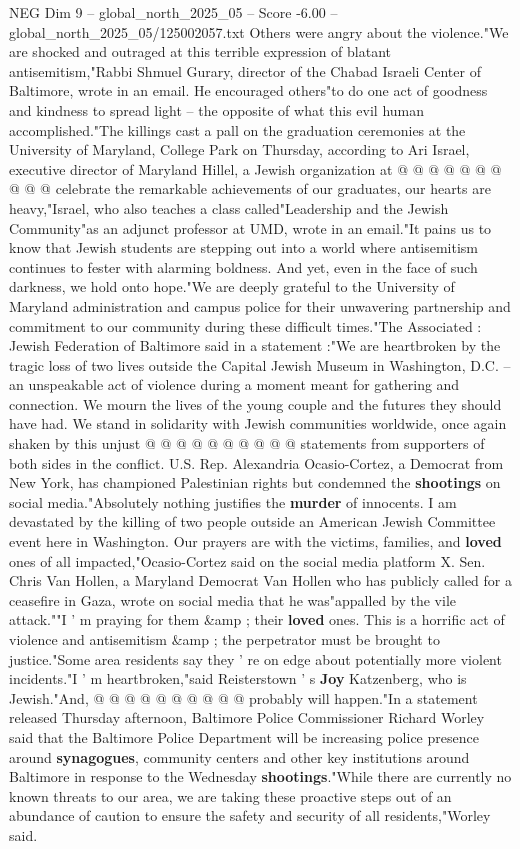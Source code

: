 \begin{textsample}{NEG Dim 9 – global\_north\_2025\_05 – Score -6.00 – global\_north\_2025\_05/125002057.txt}
Others were angry about the violence."We are shocked and outraged at this terrible expression of blatant antisemitism,"Rabbi Shmuel Gurary, director of the Chabad Israeli Center of Baltimore, wrote in an email.
He encouraged others"to do one act of goodness and kindness to spread light -- the opposite of what this evil human accomplished."The killings cast a pall on the graduation ceremonies at the University of Maryland, College Park on Thursday, according to Ari Israel, executive director of Maryland Hillel, a Jewish organization at @ @ @ @ @ @ @ @ @ @ celebrate the remarkable achievements of our graduates, our hearts are heavy,"Israel, who also teaches a class called"Leadership and the Jewish Community"as an adjunct professor at UMD, wrote in an email."It pains us to know that Jewish students are stepping out into a world where antisemitism continues to fester with alarming boldness.
And yet, even in the face of such darkness, we hold onto hope."We are deeply grateful to the University of Maryland administration and campus police for their unwavering partnership and commitment to our community during these difficult times."The Associated : Jewish Federation of Baltimore said in a statement :"We are heartbroken by the tragic loss of two lives outside the Capital Jewish Museum in Washington, D.C. -- an unspeakable act of violence during a moment meant for gathering and connection.
We mourn the lives of the young couple and the futures they should have had.
We stand in solidarity with Jewish communities worldwide, once again shaken by this unjust @ @ @ @ @ @ @ @ @ @ statements from supporters of both sides in the conflict.
U.S.
Rep.
Alexandria Ocasio-Cortez, a Democrat from New York, has championed Palestinian rights but condemned the \textbf{shootings} on social media."Absolutely nothing justifies the \textbf{murder} of innocents.
I am devastated by the killing of two people outside an American Jewish Committee event here in Washington.
Our prayers are with the victims, families, and \textbf{loved} ones of all impacted,"Ocasio-Cortez said on the social media platform X.
Sen.
Chris Van Hollen, a Maryland Democrat Van Hollen who has publicly called for a ceasefire in Gaza, wrote on social media that he was"appalled by the vile attack.""I ' m praying for them \&amp ; their \textbf{loved} ones.
This is a horrific act of violence and antisemitism \&amp ; the perpetrator must be brought to justice."Some area residents say they ' re on edge about potentially more violent incidents."I ' m heartbroken,"said Reisterstown ' s \textbf{Joy} Katzenberg, who is Jewish."And, @ @ @ @ @ @ @ @ @ @ probably will happen."In a statement released Thursday afternoon, Baltimore Police Commissioner Richard Worley said that the Baltimore Police Department will be increasing police presence around \textbf{synagogues}, community centers and other key institutions around Baltimore in response to the Wednesday \textbf{shootings}."While there are currently no known threats to our area, we are taking these proactive steps out of an abundance of caution to ensure the safety and security of all residents,"Worley said.

\end{textsample}
